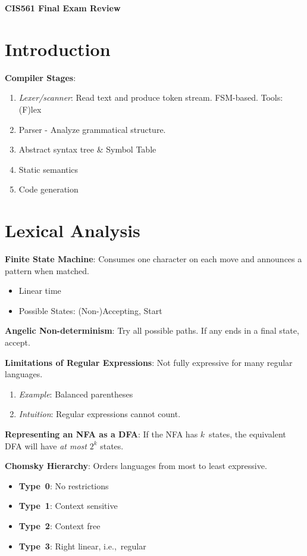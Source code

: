 \documentclass[10pt,twocolumn]{report}
\begin{document}
\twocolumn

\begin{@twocolumnfalse}
  \begin{center}
    \LARGE \textbf{CIS561 Final Exam Review}
  \end{center}
\end{@twocolumnfalse}

\section{Introduction}

\textbf{Compiler Stages}:
\begin{enumerate}
  \item \textit{Lexer/scanner}: Read text and produce token stream. FSM-based.  Tools: (F)lex
  \item Parser - Analyze grammatical structure.
  \item Abstract syntax tree \& Symbol Table
  \item Static semantics
  \item Code generation
\end{enumerate}

\section{Lexical Analysis}

\textbf{Finite State Machine}: Consumes one character on each move and announces a pattern when matched.
\begin{itemize}
  \item Linear time
  \item Possible States: (Non-)Accepting, Start
\end{itemize}

\textbf{Angelic Non-determinism}: Try all possible paths. If any ends in a final state, accept.

\textbf{Limitations of Regular Expressions}: Not fully expressive for many regular languages.
\begin{enumerate}
  \item \textit{Example}: Balanced parentheses
  \item \textit{Intuition}: Regular expressions cannot count.
\end{enumerate}

\textbf{Representing an NFA as a DFA}: If the NFA has $k$~states, the equivalent DFA will have \textit{at most} $2^{k}$ states.


\textbf{Chomsky Hierarchy}: Orders languages from most to least expressive.
\begin{itemize}
  \item \textbf{Type~0}: No restrictions
  \item \textbf{Type~1}: Context sensitive
  \item \textbf{Type~2}: Context free
  \item \textbf{Type~3}: Right linear, i.e.,~regular
\end{itemize}
\end{document}
